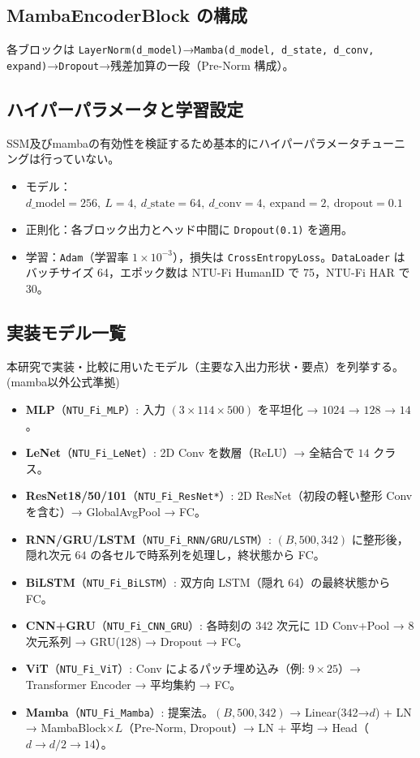 \documentclass[11pt]{ltjsarticle}
\begin{document}
\subsection*{MambaEncoderBlock の構成}
各ブロックは \texttt{LayerNorm(d\_model)}→\texttt{Mamba(d\_model, d\_state, d\_conv, expand)}→\texttt{Dropout}→残差加算の一段（Pre-Norm 構成）。

\subsection*{ハイパーパラメータと学習設定}
SSM及びmambaの有効性を検証するため基本的にハイパーパラメータチューニングは行っていない。
\begin{itemize}
  \item モデル：\(d\_\mathrm{model}=256,\ L=4,\ d\_\mathrm{state}=64,\ d\_\mathrm{conv}=4,\ \mathrm{expand}=2,\ \mathrm{dropout}=0.1\)
  \item 正則化：各ブロック出力とヘッド中間に \texttt{Dropout(0.1)} を適用。
  \item 学習：\texttt{Adam}（学習率 \(1\times10^{-3}\)），損失は \texttt{CrossEntropyLoss}。\texttt{DataLoader} はバッチサイズ 64，エポック数は NTU-Fi HumanID で 75，NTU-Fi HAR で 30。
\end{itemize}

\subsection*{実装モデル一覧}
本研究で実装・比較に用いたモデル（主要な入出力形状・要点）を列挙する。(mamba以外公式準拠)
\begin{itemize}
  \item \textbf{MLP}（\texttt{NTU\_Fi\_MLP}）: 入力 \((3\!\times\!114\!\times\!500)\) を平坦化 → \(1024\) → \(128\) → \(14\)。
  \item \textbf{LeNet}（\texttt{NTU\_Fi\_LeNet}）: 2D Conv を数層（ReLU）→ 全結合で \(14\) クラス。
  \item \textbf{ResNet18/50/101}（\texttt{NTU\_Fi\_ResNet*}）: 2D ResNet（初段の軽い整形 Conv を含む）→ GlobalAvgPool → FC。
  \item \textbf{RNN/GRU/LSTM}（\texttt{NTU\_Fi\_RNN/GRU/LSTM}）: \((B,500,342)\) に整形後，隠れ次元 \(64\) の各セルで時系列を処理し，終状態から FC。
  \item \textbf{BiLSTM}（\texttt{NTU\_Fi\_BiLSTM}）: 双方向 LSTM（隠れ \(64\)）の最終状態から FC。
  \item \textbf{CNN+GRU}（\texttt{NTU\_Fi\_CNN\_GRU}）: 各時刻の 342 次元に 1D Conv+Pool → \(8\) 次元系列 → GRU(128) → Dropout → FC。
  \item \textbf{ViT}（\texttt{NTU\_Fi\_ViT}）: Conv によるパッチ埋め込み（例: \(9\!\times\!25\)）→ Transformer Encoder → 平均集約 → FC。
  \item \textbf{Mamba}（\texttt{NTU\_Fi\_Mamba}）: 提案法。\((B,500,342)\) → Linear(342→\(d\)) + LN → \(\)MambaBlock\(\times L\)（Pre-Norm, Dropout）→ LN + 平均 → \(\)Head（\(d\to d/2\to 14\)）。
\end{itemize}
\end{document}
